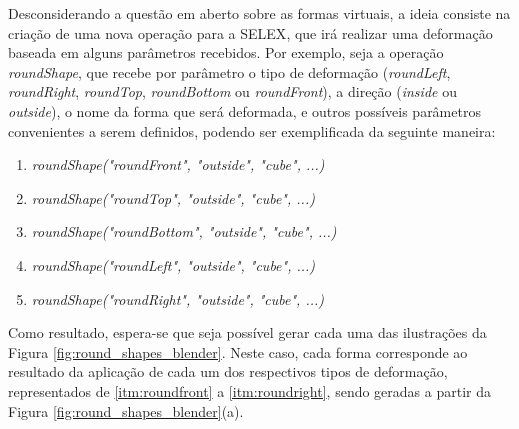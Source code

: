Desconsiderando a questão em aberto sobre as formas virtuais, a ideia consiste na criação de uma nova operação para a \gls{SELEX}, que irá realizar uma deformação baseada em alguns parâmetros recebidos. Por exemplo, seja a operação \textit{roundShape}, que recebe por parâmetro o tipo de deformação (\textit{roundLeft}, \textit{roundRight}, \textit{roundTop}, \textit{roundBottom} ou \textit{roundFront}), a direção (\textit{inside} ou \textit{outside}), o nome da forma que será deformada, e outros possíveis parâmetros convenientes a serem definidos, podendo ser exemplificada da seguinte maneira:

\newpage

\vspace{0.5cm}

\begin{enumerate}[label=(\roman*)]
  \item \label{itm:roundfront} \textit{roundShape("roundFront", "outside", "cube", ...)}
  \item \label{itm:roundtop} \textit{roundShape("roundTop", "outside", "cube", ...)}
  \item \label{itm:roundbottom} \textit{roundShape("roundBottom", "outside", "cube", ...)}
  \item \label{itm:roundleft} \textit{roundShape("roundLeft", "outside", "cube", ...)}
  \item \label{itm:roundright} \textit{roundShape("roundRight", "outside", "cube", ...)}
\end{enumerate}

\vspace{0.5cm}

Como resultado, espera-se que seja possível gerar cada uma das ilustrações da Figura \ref{fig:round_shapes_blender}. Neste caso, cada forma corresponde ao resultado da aplicação de cada um dos respectivos tipos de deformação, representados de \ref{itm:roundfront} a \ref{itm:roundright}, sendo geradas a partir da Figura \ref{fig:round_shapes_blender}(a).

